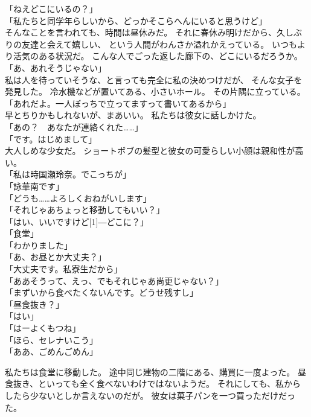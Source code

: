 \documentclass[../IHMain]{subfiles}
\begin{document}
「ねえどこにいるの？」\\
「私たちと同学年らしいから、どっかそこらへんにいると思うけど」\\
そんなことを言われても、時間は昼休みだ。
それに春休み明けだから、久しぶりの友達と会えて嬉しい、
という人間がわんさか溢れかえっている。
いつもより活気のある状況だ。
こんな人でごった返した廊下の、どこにいるだろうか。\\
「あ、あれそうじゃない」\\
私は人を待っていそうな、と言っても完全に私の決めつけだが、
そんな女子を発見した。
冷水機などが置いてある、小さいホール。
その片隅に立っている。\\
「あれだよ。一人ぼっちで立ってますって書いてあるから」\\
早とちりかもしれないが、まあいい。
私たちは彼女に話しかけた。\\
「あの？　あなたが連絡くれた……」\\
「です。はじめまして」\\
大人しめな少女だ。
ショートボブの髪型と彼女の可愛らしい小顔は親和性が高い。\\
「私は時国瀬玲奈。でこっちが」\\
「詠華南です」\\
「どうも……よろしくおねがいします」\\
「それじゃあちょっと移動してもいい？」\\
「はい、いいですけど\scalebox{3}[1]{―}どこに？」\\
「食堂」\\
「わかりました」\\
「あ、お昼とか大丈夫？」\\
「大丈夫です。私寮生だから」\\
「ああそうって、えっ、でもそれじゃあ尚更じゃない？」\\
「まずいから食べたくないんです。どうせ残すし」\\
「昼食抜き？」\\
「はい」\\
「はーよくもつね」\\
「ほら、セレナいこう」\\
「ああ、ごめんごめん」

私たちは食堂に移動した。
途中同じ建物の二階にある、購買に一度よった。
昼食抜き、といっても全く食べないわけではないようだ。
それにしても、私からしたら少ないとしか言えないのだが。
彼女は菓子パンを一つ買っただけだった。
\end{document}
